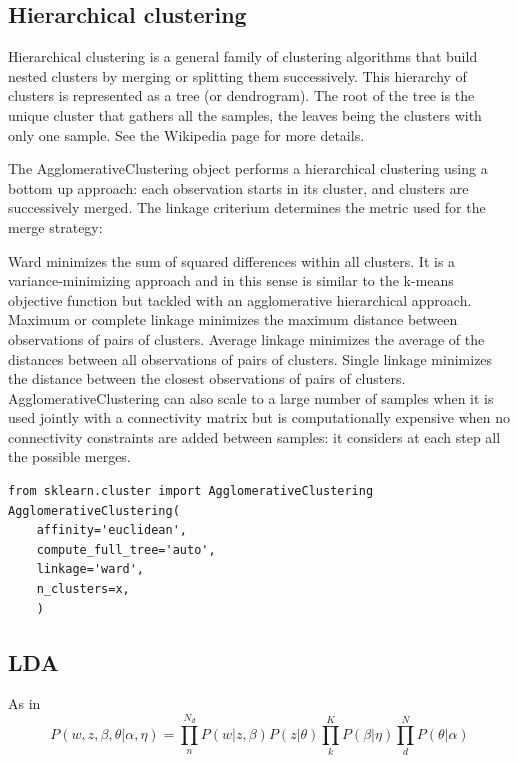 \subsection{Hierarchical clustering}

Hierarchical clustering is a general family of clustering algorithms that build nested clusters by merging or splitting them successively. This hierarchy of clusters is represented as a tree (or dendrogram). The root of the tree is the unique cluster that gathers all the samples, the leaves being the clusters with only one sample. See the Wikipedia page for more details.

The AgglomerativeClustering object performs a hierarchical clustering using a bottom up approach: each observation starts in its cluster, and clusters are successively merged. The linkage criterium determines the metric used for the merge strategy:

Ward minimizes the sum of squared differences within all clusters. It is a variance-minimizing approach and in this sense is similar to the k-means objective function but tackled with an agglomerative hierarchical approach.
Maximum or complete linkage minimizes the maximum distance between observations of pairs of clusters.
Average linkage minimizes the average of the distances between all observations of pairs of clusters.
Single linkage minimizes the distance between the closest observations of pairs of clusters.
AgglomerativeClustering can also scale to a large number of samples when it is used jointly with a connectivity matrix but is computationally expensive when no connectivity constraints are added between samples: it considers at each step all the possible merges.
\begin{lstlisting}[style=mypython]
from sklearn.cluster import AgglomerativeClustering
AgglomerativeClustering(
    affinity='euclidean',
    compute_full_tree='auto',
    linkage='ward',
    n_clusters=x,
    )
\end{lstlisting}

\subsection{LDA}\label{sec:lda}
As in ~\cite{Zhou2016}
\begin{equation}\label{eq:lda}
P(w, z,\beta, \theta| \alpha, \eta)=\prod_n^{N_d} P(w|z,\beta)P(z|\theta)\prod_k^KP(\beta|\eta)\prod_d^N P(\theta | \alpha)
\end{equation}

